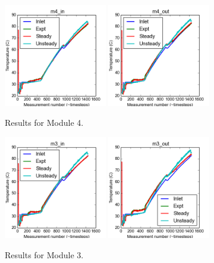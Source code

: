 \documentclass{article}
\begin{document}
\clearpage
\begin{figure}[!ht]
\centering
\includegraphics[width=0.4\textwidth]{../../data/ICSolar/images/Mar06_m4_in_compare.png}\hspace{0.05\textwidth}
\includegraphics[width=0.4\textwidth]{../../data/ICSolar/images/Mar06_m4_out_compare.png}\hspace{0.05\textwidth}\\
\caption{Results for Module 4.}\end{figure}
\begin{figure}[!ht]
\centering
\includegraphics[width=0.4\textwidth]{../../data/ICSolar/images/Mar06_m3_in_compare.png}\hspace{0.05\textwidth}
\includegraphics[width=0.4\textwidth]{../../data/ICSolar/images/Mar06_m3_out_compare.png}\hspace{0.05\textwidth}\\
\caption{Results for Module 3.}\end{figure}
\end{document}
